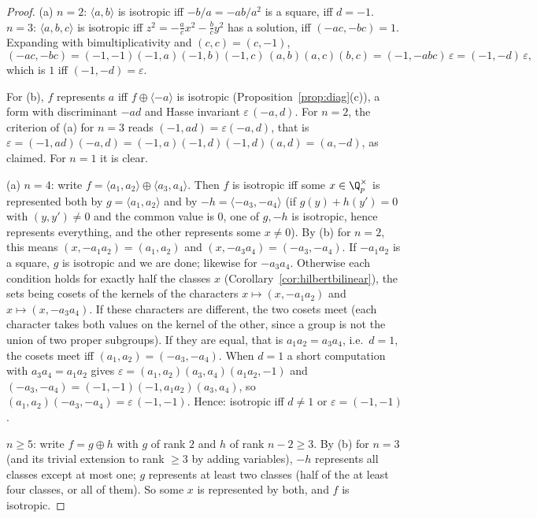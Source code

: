 \begin{proof}
(a) $n=2$: $\langle a,b\rangle$ is isotropic iff $-b/a=-ab/a^2$ is a square, iff $d=-1$. $n=3$: $\langle a,b,c\rangle$ is isotropic iff
$z^2=-\frac acx^2-\frac bcy^2$ has a solution, iff $(-ac,-bc)=1$. Expanding with bimultiplicativity and $(c,c)=(c,-1)$,
\[
(-ac,-bc)=(-1,-1)(-1,a)(-1,b)(-1,c)\,(a,b)(a,c)(b,c)=(-1,-abc)\,\varepsilon=(-1,-d)\,\varepsilon,
\]
which is $1$ iff $(-1,-d)=\varepsilon$.

For (b), $f$ represents $a$ iff $f\oplus\langle-a\rangle$ is isotropic (Proposition~\ref{prop:diag}(c)), a form with
discriminant $-ad$ and Hasse invariant $\varepsilon\,(-a,d)$. For $n=2$, the criterion of (a) for $n=3$ reads $(-1,ad)=
\varepsilon(-a,d)$, that is $\varepsilon=(-1,ad)(-a,d)=(-1,a)(-1,d)(-1,d)(a,d)=(a,-d)$, as claimed. For $n=1$ it is clear.

(a) $n=4$: write $f=\langle a_1,a_2\rangle\oplus\langle a_3,a_4\rangle$. Then $f$ is isotropic iff some $x\in\Q_p^\times$ is
represented both by $g=\langle a_1,a_2\rangle$ and by $-h=\langle-a_3,-a_4\rangle$ (if $g(y)+h(y')=0$ with $(y,y')\ne0$ and the
common value is $0$, one of $g,-h$ is isotropic, hence represents everything, and the other represents some $x\ne0$). By (b)
for $n=2$, this means $(x,-a_1a_2)=(a_1,a_2)$ and $(x,-a_3a_4)=(-a_3,-a_4)$. If $-a_1a_2$ is a square, $g$ is isotropic and we are
done; likewise for $-a_3a_4$. Otherwise each condition holds for exactly half the classes $x$ (Corollary~\ref{cor:hilbertbilinear}),
the sets being cosets of the kernels of the characters $x\mapsto(x,-a_1a_2)$ and $x\mapsto(x,-a_3a_4)$. If these characters are
different, the two cosets meet (each character takes both values on the kernel of the other, since a group is not the union of
two proper subgroups). If they are equal, that is $a_1a_2=a_3a_4$, i.e.\ $d=1$, the cosets meet iff $(a_1,a_2)=(-a_3,-a_4)$.
When $d=1$ a short computation with $a_3a_4=a_1a_2$ gives $\varepsilon=(a_1,a_2)(a_3,a_4)(a_1a_2,-1)$ and $(-a_3,-a_4)=(-1,-1)
(-1,a_1a_2)(a_3,a_4)$, so $(a_1,a_2)(-a_3,-a_4)=\varepsilon\,(-1,-1)$. Hence: isotropic iff $d\ne1$ or $\varepsilon=(-1,-1)$.

$n\ge5$: write $f=g\oplus h$ with $g$ of rank $2$ and $h$ of rank $n-2\ge3$. By (b) for $n=3$ (and its trivial extension to rank
$\ge3$ by adding variables), $-h$ represents all classes except at most one; $g$ represents at least two classes (half of the at
least four classes, or all of them). So some $x$ is represented by both, and $f$ is isotropic.


\end{proof}

